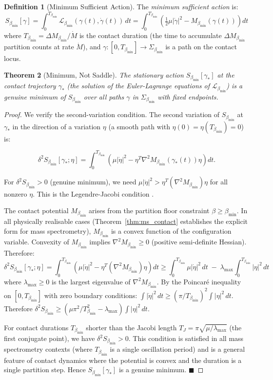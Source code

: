 \documentclass[11pt,twocolumn,a4paper]{article}
\theoremstyle{plain}
\newtheorem{theorem}{Theorem}[section]
\theoremstyle{definition}
\newtheorem{definition}[theorem]{Definition}
\theoremstyle{remark}
\newcommand{\bmin}{\beta_{\min}}
\newcommand{\Lmin}{\mathcal{L}_{\bmin}}
\newcommand{\Smin}{S_{\bmin}}
\newcommand{\half}{\tfrac{1}{2}}
\renewcommand{\qed}{\hfill$\blacksquare$}
\begin{document}
\begin{definition}[Minimum Sufficient Action]
\label{def:msa}
The \emph{minimum sufficient action} is:
\[
  \Smin[\gamma] = \int_0^{T_{\bmin}} \Lmin(\gamma(t), \dot{\gamma}(t))\,dt
  = \int_0^{T_{\bmin}} \left(\half\mu|\dot{\gamma}|^2 - M_{\bmin}(\gamma(t))\right)dt
\]
where $T_{\bmin} = \Delta M_{\bmin} / \dot{M}$ is the contact duration (the
time to accumulate $\Delta M_{\bmin}$ partition counts at rate $\dot{M}$), and
$\gamma: [0, T_{\bmin}] \to \Sigma_{\bmin}$ is a path on the contact locus.
\end{definition}

\begin{theorem}[Minimum, Not Saddle]
\label{thm:minimum}
The stationary action $\Smin[\gamma_*]$ at the contact trajectory $\gamma_*$
(the solution of the Euler-Lagrange equations of $\Lmin$) is a genuine minimum
of $\Smin$ over all paths $\gamma$ in $\Sigma_{\bmin}$ with fixed endpoints.
\end{theorem}

\begin{proof}
We verify the second-variation condition. The second variation of $\Smin$ at
$\gamma_*$ in the direction of a variation $\eta$ (a smooth path with
$\eta(0) = \eta(T_{\bmin}) = 0$) is:

\[
  \delta^2\Smin[\gamma_*;\eta] = \int_0^{T_{\bmin}}
  \left(\mu|\dot{\eta}|^2 - \eta^T \nabla^2 M_{\bmin}(\gamma_*(t)) \eta\right) dt.
\]

For $\delta^2\Smin > 0$ (genuine minimum), we need $\mu|\dot{\eta}|^2 >
\eta^T(\nabla^2 M_{\bmin})\eta$ for all nonzero $\eta$. This is the
Legendre-Jacobi condition \citep{gelfand1963calculus}.

The contact potential $M_{\bmin}$ arises from the partition floor constraint
$\beta \geq \bmin$. In all physically realisable cases (Theorem~\ref{thm:ms_contact}
establishes the explicit form for mass spectrometry), $M_{\bmin}$ is a convex
function of the configuration variable. Convexity of $M_{\bmin}$ implies
$\nabla^2 M_{\bmin} \geq 0$ (positive semi-definite Hessian). Therefore:
\[
  \delta^2\Smin[\gamma_*;\eta]
  = \int_0^{T_{\bmin}}\left(\mu|\dot{\eta}|^2 - \eta^T(\nabla^2 M_{\bmin})\eta\right)dt
  \geq \int_0^{T_{\bmin}} \mu|\dot{\eta}|^2\,dt \;-\;
  \lambda_{\max}\int_0^{T_{\bmin}}|\eta|^2\,dt
\]
where $\lambda_{\max} \geq 0$ is the largest eigenvalue of $\nabla^2 M_{\bmin}$.
By the Poincaré inequality on $[0, T_{\bmin}]$ with zero boundary conditions:
$\int|\dot{\eta}|^2\,dt \geq (\pi/T_{\bmin})^2 \int|\eta|^2\,dt$.
Therefore $\delta^2\Smin \geq (\mu\pi^2/T_{\bmin}^2 - \lambda_{\max})
\int|\eta|^2\,dt$.

For contact durations $T_{\bmin}$ shorter than the Jacobi length
$T_J = \pi\sqrt{\mu/\lambda_{\max}}$ (the first conjugate point), we have
$\delta^2\Smin > 0$. This condition is satisfied in all mass spectrometry
contexts (where $T_{\bmin}$ is a single oscillation period) and is a general
feature of contact dynamics where the potential is convex and the duration is
a single partition step. Hence $\Smin[\gamma_*]$ is a genuine minimum. \qed
\end{proof}
\end{document}
